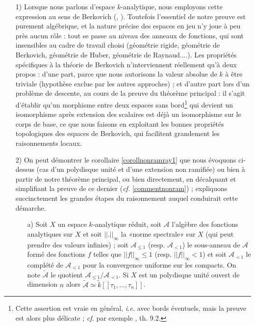 \documentclass[10pt,leqno]{article}
\renewcommand{\leq}{\leqslant}
\renewcommand{\cal}{\mathscr}
\newcommand{\red}{\widetilde}
\begin{document}
\begin{itemize}

\medskip
\item[1)] Lorsque nous parlons d'espace $k$-analytique, nous employons cette expression au sens de Berkovich (\cite{brk1}, \cite{brk2}). Toutefois l'essentiel de notre preuve est purement algébrique, et la nature précise des espaces en jeu n'y joue à peu près aucun rôle : tout se passe au niveau des anneaux de fonctions, qui sont insensibles au cadre de travail choisi (géométrie rigide, géométrie de Berkovich, géométrie de Huber, géométrie de Raynaud....). Les propriétés spécifiques à la théorie de Berkovich n'interviennent réellement qu'à deux propos : d'une part, parce que nous autorisons la valeur absolue de $k$ à être triviale (hypothèse exclue par les autres approches) ; et d'autre part lors d'un problème de descente, au cours de la preuve du théorème principal : il s'agit d'établir qu'un morphisme entre deux espaces sans bord\footnote{Cette assertion est vraie en général, {\em i.e.} avec bords éventuels, mais la preuve est alors plus délicate ; {\em cf.} par exemple \cite{cnrtmk}, th. 9.2. } qui devient un isomorphisme après extension des scalaires est déjà un isomorphisme sur le corps de base, ce que nous faisons en exploitant les bonnes propriétés topologiques des espaces de Berkovich, qui facilitent grandement les raisonnements locaux. 

\medskip
\item[2)] On peut démontrer le corollaire \ref{corollnonramray1} que nous évoquons ci-dessus (cas d'un polydisque unité et d'une extension non ramifiée) ou bien à partir de notre théorème principal, ou bien directement, en décalquant et simplifiant la preuve de ce dernier ({\em cf.} \ref{commentnonram}) ; expliquons succinctement les grandes étapes du raisonnement auquel conduirait cette démarche. 

\begin{itemize}
\medskip
\item[a)] Soit $X$ un espace $k$-analytique réduit, soit $\cal A$ l'algèbre des fonctions analytiques sur $X$ et soit $||.||_{\infty}$ la «norme spectrale» sur $X$ (qui peut prendre des valeurs infinies) ; soit ${\cal A}_{\leq 1}$ (resp. ${\cal A}_{<1}$)  le sous-anneau de $\cal A$ formé des fonctions $f$ telles que $||f||_{\infty}\leq 1$ (resp. $||f||_\infty<1$) et soit ${\cal A}_{\prec 1}$ le complété de ${\cal A}_{<1}$ pour la convergence uniforme sur les compacts. On note $\red {\cal A}$ le quotient ${\cal A}_{\leq 1}/{\cal A}_{\prec 1}$. Si $X$ est un polydisque unité ouvert de dimension $n$ alors $\red{\cal A}\simeq \red k [[\tau_1,\ldots, \tau_n]]$. 


\end{itemize}
\end{itemize}
\end{document}
